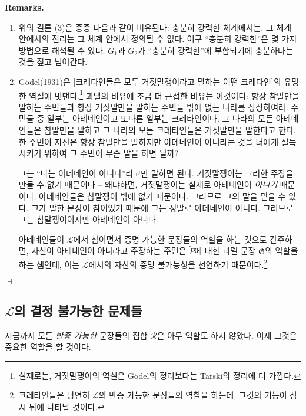 \documentclass[12pt]{paper}
\newenvironment{context}[1][]
{ \noindent \textbf{{#1}.}
}
{ \hfill $ \dashv $
}
\begin{document}
  \begin{context}[Remarks]
    \begin{enumerate}
      \item 위의 결론 (3)은 종종 다음과 같이 비유된다:
      충분히 강력한 체계에서는, 그 체계 안에서의 진리는 그 체계 안에서 정의될 수 없다.
      어구 ``충분히 강력한''은 몇 가지 방법으로 해석될 수 있다.
      $G_1$과 $G_2$가 ``충분히 강력한''에 부합되기에 충분하다는 것을 짚고 넘어간다.

      \item G\"odel(1931)은 [크레타인들은 모두 거짓말쟁이라고 말하는 어떤 크레타인]의 유명한 역설에 빗댄다.\footnote
      {
        실제로는, 거짓말쟁이의 역설은 G\"odel의 정리보다는 Tarski의 정리에 더 가깝다.
      }
      괴델의 비유에 조금 더 근접한 비유는 이것이다:
      항상 참말만을 말하는 주민들과 항상 거짓말만을 말하는 주민들 밖에 없는 나라를 상상하여라.
      주민들 중 일부는 아테네인이고 또다른 일부는 크레타인이다.
      그 나라의 모든 아테네인들은 참말만을 말하고 그 나라의 모든 크레타인들은 거짓말만을 말한다고 한다.
      한 주민이 자신은 항상 참말만을 말하지만 아테네인이 아니라는 것을 너에게 설득시키기 위하여 그 주민이 무슨 말을 하면 될까?

      그는 ``나는 아테네인이 아니다''라고만 말하면 된다.
      거짓말쟁이는 그러한 주장을 만들 수 없기 때문이다 --
      왜냐하면, 거짓말쟁이는 실제로 아테네인이 \textit{아니기} 때문이다;
      아테네인들은 참말쟁이 밖에 없기 때문이다.
      그러므로 그의 말을 믿을 수 있다.
      그가 말한 문장이 참이었기 때문에 그는 정말로 아테네인이 아니다.
      그러므로 그는 참말쟁이이지만 아테네인이 아니다.

      아테네인들이 $\mathcal{L}$에서 참이면서 증명 가능한 문장들의 역할을 하는 것으로 간주하면,
      자신이 아테네인이 아니라고 주장하는 주민은 $\tilde{P}$에 대한 괴델 문장 $\mathfrak{G}$의 역할을 하는 셈인데,
      이는 $\mathcal{L}$에서의 자신의 증명 불가능성을 선언하기 때문이다.\footnote
      {
        크레타인들은 당연히 $\mathcal{L}$의 반증 가능한 문장들의 역할을 하는데,
        그것의 기능이 잠시 뒤에 나타날 것이다.
      }
    \end{enumerate}
  \end{context}

  \subsection{$\mathcal{L}$의 결정 불가능한 문제들}
  \hspace{12pt}

  지금까지 모든 \textit{반증 가능한} 문장들의 집합 $\mathcal{R}$은 아무 역할도 하지 않았다.
  이제 그것은 중요한 역할을 할 것이다.
\end{document}
